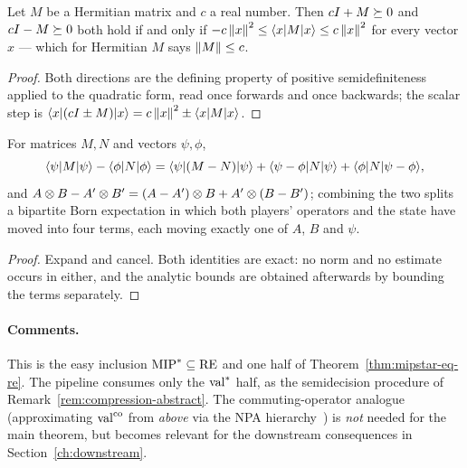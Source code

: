 \begin{lemma}
\label{lem:norm-two-psd}
\leanok
{}
Let $M$ be a Hermitian matrix and $c$ a real number. Then $cI + M \succeq 0$ and
$cI - M \succeq 0$ both hold if and only if $-c\left\| {x} \right\|^2 \leq \langle x| M |x\rangle
\leq c \left\| {x} \right\|^2$ for every vector $x$ --- which for Hermitian $M$ says
$\left\| {M} \right\| \leq c$.
\end{lemma}

\begin{proof}
\leanok
Both directions are the defining property of positive semidefiniteness applied to the
quadratic form, read once forwards and once backwards; the scalar step is
$\langle x|(cI \pm M)|x\rangle = c\left\| {x} \right\|^2 \pm \langle x| M |x\rangle$.
\end{proof}

\begin{lemma}
\label{lem:perturbation-split}
\leanok
{}
For matrices $M, N$ and vectors $\psi, \phi$,
\[
\langle\psi| M |\psi\rangle - \langle\phi| N |\phi\rangle
  = \langle\psi| (M - N) |\psi\rangle + \langle\psi - \phi| N |\psi\rangle
    + \langle\phi| N |\psi - \phi\rangle,
\]
and $A \otimes B - A' \otimes B' = (A - A') \otimes B + A' \otimes (B - B')$; combining the two splits a
bipartite Born expectation in which both players' operators and the state have moved into
four terms, each moving exactly one of $A$, $B$ and $\psi$.
\end{lemma}

\begin{proof}
\leanok
Expand and cancel. Both identities are exact: no norm and no estimate occurs in either,
and the analytic bounds are obtained afterwards by bounding the terms separately.
\end{proof}

\paragraph{Comments.} This is the easy inclusion $\mathrm{MIP}^* \subseteq \mathrm{RE}$ and one half
of Theorem~\ref{thm:mipstar-eq-re}. The pipeline consumes only the $\mathrm{val}^*$ half, as the
semidecision procedure of Remark~\ref{rem:compression-abstract}. The commuting-operator analogue (approximating
$\mathrm{val}^{\mathrm{co}}$ from \emph{above} via the NPA hierarchy~\cite{NPA08}) is \emph{not} needed for
the main theorem, but becomes relevant for the downstream consequences in
Section~\ref{ch:downstream}.
